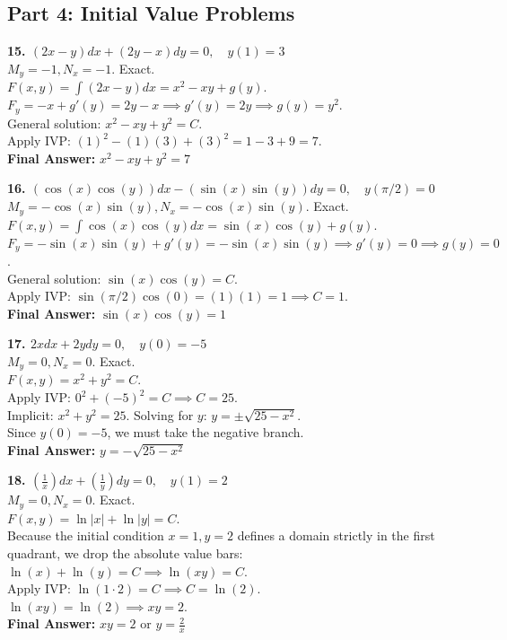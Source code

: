 \documentclass[11pt]{article}
\begin{document}
\subsection*{Part 4: Initial Value Problems}

\textbf{15. $(2x - y)dx + (2y - x)dy = 0, \quad y(1) = 3$} \\
$M_y = -1, N_x = -1$. Exact. \\
$F(x,y) = \int (2x-y)dx = x^2 - xy + g(y)$. \\
$F_y = -x + g'(y) = 2y - x \implies g'(y) = 2y \implies g(y) = y^2$. \\
General solution: $x^2 - xy + y^2 = C$. \\
Apply IVP: $(1)^2 - (1)(3) + (3)^2 = 1 - 3 + 9 = 7$. \\
\textbf{Final Answer:} $x^2 - xy + y^2 = 7$

\textbf{16. $(\cos(x)\cos(y))dx - (\sin(x)\sin(y))dy = 0, \quad y(\pi/2) = 0$} \\
$M_y = -\cos(x)\sin(y), N_x = -\cos(x)\sin(y)$. Exact. \\
$F(x,y) = \int \cos(x)\cos(y)dx = \sin(x)\cos(y) + g(y)$. \\
$F_y = -\sin(x)\sin(y) + g'(y) = -\sin(x)\sin(y) \implies g'(y) = 0 \implies g(y) = 0$. \\
General solution: $\sin(x)\cos(y) = C$. \\
Apply IVP: $\sin(\pi/2)\cos(0) = (1)(1) = 1 \implies C = 1$. \\
\textbf{Final Answer:} $\sin(x)\cos(y) = 1$

\textbf{17. $2x dx + 2y dy = 0, \quad y(0) = -5$} \\
$M_y = 0, N_x = 0$. Exact. \\
$F(x,y) = x^2 + y^2 = C$. \\
Apply IVP: $0^2 + (-5)^2 = C \implies C = 25$. \\
Implicit: $x^2 + y^2 = 25$. Solving for $y$: $y = \pm\sqrt{25-x^2}$. \\
Since $y(0) = -5$, we must take the negative branch. \\
\textbf{Final Answer:} $y = -\sqrt{25 - x^2}$

\textbf{18. $(\frac{1}{x})dx + (\frac{1}{y})dy = 0, \quad y(1) = 2$} \\
$M_y = 0, N_x = 0$. Exact. \\
$F(x,y) = \ln|x| + \ln|y| = C$. \\
Because the initial condition $x=1, y=2$ defines a domain strictly in the first quadrant, we drop the absolute value bars: $\ln(x) + \ln(y) = C \implies \ln(xy) = C$. \\
Apply IVP: $\ln(1 \cdot 2) = C \implies C = \ln(2)$. \\
$\ln(xy) = \ln(2) \implies xy = 2$. \\
\textbf{Final Answer:} $xy = 2$ or $y = \frac{2}{x}$
\end{document}

